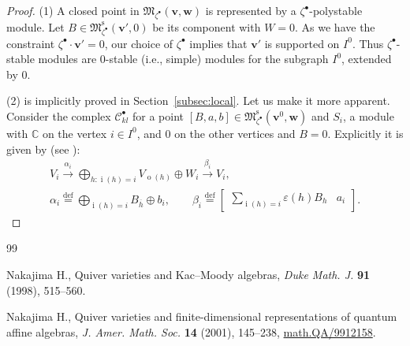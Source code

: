 \documentclass[10pt,a4paper]{amsart}
\theoremstyle{definition}
\numberwithin{equation}{section}
\newcommand{\subsecref}[1]{Section~\ref{#1}}
\newcommand{\defeq}{\overset{\operatorname{\scriptstyle def}}{=}}
\newcommand{\C}{{\mathbb C}}
\newcommand{\vin}[1]{\operatorname{i}(#1)} %
\newcommand{\vout}[1]{\operatorname{o}(#1)} %
\newcommand{\M}{{\mathfrak M}} %
\newcommand{\Mreg}{\M^{\operatorname{s}}}
\newcommand{\bv}{{\mathbf v}} %
\newcommand{\bw}{{\mathbf w}} %
\begin{document}
\begin{proof}
  (1) A closed point in $\M_{\zeta^\bullet}(\bv,\bw)$ is represented
  by a $\zeta^\bullet$-polystable module. Let
  $B\in\Mreg_{\zeta^\bullet}(\bv',0)$ be its component with $W = 0$.
  As we have the constraint $\zeta^\bullet\cdot \bv' = 0$, our choice
  of $\zeta^\bullet$ implies that $\bv'$ is supported on $I^0$. Thus
  $\zeta^\bullet$-stable modules are $0$-stable (i.e., simple) modules
  for the subgraph $I^0$, extended by $0$.


(2) is implicitly proved in \subsecref{subsec:local}. Let us make it
more apparent. Consider the complex $\mathscr{C}^{\bullet}_{kl}$ for a point
$[B,a,b]\in \Mreg_{\zeta^\bullet}(\bv^0,\bw)$ and $S_i$, a module with
$\C$ on the vertex $i\in I^0$, and $0$ on the other vertices and $B =
0$. Explicitly it is given by (see \cite[(4.2)]{Na-alg}):
\begin{gather}\label{eq:crystalcpx}
 V_i
  \xrightarrow{\alpha_i}
  \bigoplus_{h: \vin{h} = i} V_{\vout{h}} \oplus W_i
  \xrightarrow{\beta_i} V_i,
\\
   \alpha_i\defeq
    \bigoplus_{\vin{h}=i} B_{\overline h}\oplus b_i, \qquad
   \beta_i\defeq
    \begin{bmatrix}
    \displaystyle\sum_{\vin{h}=i} \varepsilon(h) B_h & a_i
    \end{bmatrix}.\tag*{\qed}
\end{gather}\renewcommand{\qed}{}
\end{proof}

%
\begin{thebibliography}{99}

Nakajima H., Quiver varieties and Kac--Moody algebras, {\it Duke Math. J.}
  \textbf{91} (1998), 515--560. %

Nakajima H., Quiver varieties and f\/inite-dimensional representations of
  quantum af\/f\/ine algebras, {\it J. Amer. Math. Soc.} \textbf{14} (2001),
  145--238, \href{http://arxiv.org/abs/math.QA/9912158}{math.QA/9912158}. %

\end{thebibliography}
\end{document}
